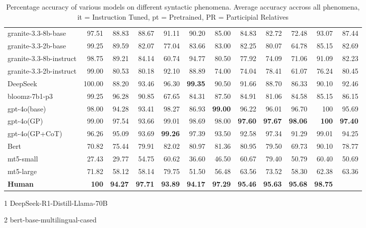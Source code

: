 \documentclass[11pt]{article}
\begin{document}
\begin{table}[ht!]
\begin{threeparttable}
{\begin{tabular}{lrrrrrrrrrrr}
granite-3.3-8b-base & 97.51  & 88.83  & 88.67  & 91.11  & 90.20  & 85.00  & 84.83  & 82.72  & 72.48  & 93.07  & 87.44  \\
granite-3.3-2b-base & 99.25  & 89.59  & 82.07  & 77.04  & 83.66  & 83.00  & 82.25  & 80.07  & 64.78  & 85.15  & 82.69  \\
granite-3.3-8b-instruct & 98.75  & 89.21  & 84.14  & 60.74  & 94.77  & 80.50  & 77.92  & 74.09  & 71.06  & 91.09  & 82.23  \\
granite-3.3-2b-instruct & 99.00  & 80.53  & 80.18  & 92.10  & 88.89  & 74.00  & 74.04  & 78.41  & 61.07  & 76.24  & 80.45  \\
DeepSeek\tnote{1} & 100.00  & 88.20  & 93.46  & 96.30  & \textbf{99.35 } & 90.50  & 91.66  & 88.70  & 86.33  & 90.10  & 92.46  \\
bloomz-7b1-p3 & 99.25  & 96.28  & 90.85  & 67.65  & 84.31  & 87.50  & 84.91  & 81.06  & 84.58  & 85.15  & 86.15  \\
gpt-4o(base) &98.00 &94.28 & 93.41& 98.27&86.93 &\textbf{99.00}  &96.22  & 96.01&96.70 & 100 & 95.69\\

gpt-4o(GP) &99.00 &97.54 & 93.66&99.01 &98.69 & 98.00&\textbf{97.60} &\textbf{97.67}& \textbf{98.06} & \textbf{100} & \textbf{97.40} \\

gpt-4o(GP+CoT) &96.26 & 95.09&93.69 &\textbf{99.26} &97.39 &93.50&92.58&97.34 & 91.29& 99.01 &94.25 \\

Bert\tnote{2} & 70.82 & 75.44 & 79.91 & 82.02 & 80.97 & 81.36 & 80.95 & 79.50 & 69.73 & 90.10 & 78.77 \\
mt5-small & 27.43 & 29.77 & 54.75 & 60.62 & 36.60 & 46.50 & 60.67 & 79.40 & 50.79 & 60.40 & 50.69 \\
mt5-large & 71.82& 58.12& 58.14& 79.75& 51.50& 56.48& 63.56& 73.52& 58.30& 62.38& 63.36\\


\rowcolor{gray!20}
\textbf{Human} & \textbf{100} & \textbf{94.27} & \textbf{97.71} & \textbf{93.89} & \textbf{94.17} & \textbf{97.29} & \textbf{95.46} & \textbf{95.63} & \textbf{95.68} & \textbf{98.75} \\

\bottomrule
\end{tabular}
}
\caption{Percentage accuracy of various models on  different syntactic phenomena. Average accuracy accross all phenomena, it = Instruction Tuned, pt = Pretrained, PR = Participial Relatives}

\begin{tablenotes}
\item[1] DeepSeek-R1-Distill-Llama-70B
\item[2] bert-base-multilingual-cased
\end{tablenotes}
\label{tab:syntactic-eval}
\end{threeparttable}
\end{table}
\end{document}
